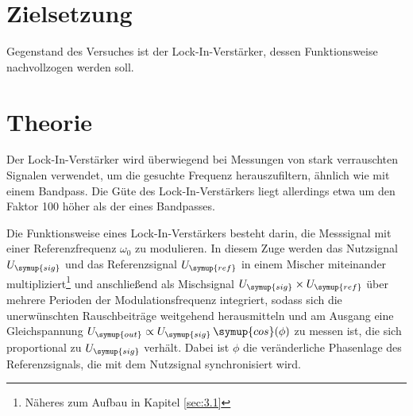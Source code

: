 \maketitle
\newpage

\section{Zielsetzung}
Gegenstand des Versuches ist der Lock-In-Verstärker, dessen Funktionsweise
nachvollzogen werden soll.

\section{Theorie}
\label{sec:2}
Der Lock-In-Verstärker wird überwiegend bei Messungen von stark verrauschten Signalen
verwendet, um die gesuchte Frequenz herauszufiltern, ähnlich wie mit einem Bandpass.
Die Güte des Lock-In-Verstärkers liegt allerdings etwa um den Faktor 100 höher als
der eines Bandpasses.

Die Funktionsweise eines Lock-In-Verstärkers besteht darin,
die Messsignal mit einer Referenzfrequenz $\omega_0$ zu modulieren. In diesem Zuge
werden das Nutzsignal $U_{\symup{sig}}$ und das Referenzsignal $U_{\symup{ref}}$ in einem Mischer
miteinander multipliziert\footnote{Näheres zum Aufbau in Kapitel \ref{sec:3.1}}
und anschließend als Mischsignal $U_{\symup{sig}} \times U_{\symup{ref}}$ über mehrere Perioden
der Modulationsfrequenz integriert, sodass sich die unerwünschten Rauschbeiträge
weitgehend herausmitteln und am Ausgang eine Gleichspannung $U_{\symup{out}} \propto U_{\symup{sig}} \,
\symup{cos}(\phi)$ zu messen ist, die sich proportional zu $U_{\symup{sig}}$ verhält. Dabei
ist $\phi$ die veränderliche Phasenlage des Referenzsignals, die mit dem Nutzsignal synchronisiert
wird.

